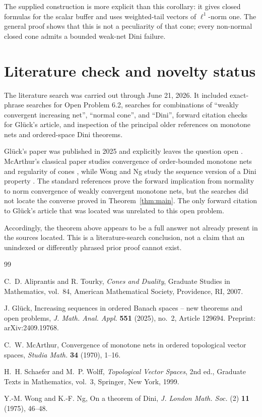 \documentclass[11pt]{article}
\theoremstyle{remark}
\begin{document}
The supplied construction is more explicit than this corollary: it gives
closed formulas for the scalar buffer and uses weighted-tail vectors of
$\ell^1$-norm one.  The general proof shows that this is not a peculiarity
of that cone; every non-normal closed cone admits a bounded weak-net Dini
failure.

\section{Literature check and novelty status}

The literature search was carried out through June 21, 2026.  It included
exact-phrase searches for Open Problem 6.2, searches for combinations of
``weakly convergent increasing net'', ``normal cone'', and ``Dini'', forward
citation checks for Gl\"uck's article, and inspection of the principal older
references on monotone nets and ordered-space Dini theorems.

Gl\"uck's paper was published in 2025 and explicitly leaves the question
open \cite{Glueck2025}.  McArthur's classical paper studies convergence of
order-bounded monotone nets and regularity of cones
\cite{McArthur1970}, while Wong and Ng study the sequence version of a Dini
property \cite{WongNg1975}.  The standard references prove the forward
implication from normality to norm convergence of weakly convergent
monotone nets, but the searches did not locate the converse proved in
Theorem~\ref{thm:main}.  The only forward citation to Gl\"uck's article that
was located was unrelated to this open problem.

Accordingly, the theorem above appears to be a full answer not already
present in the sources located.  This is a literature-search conclusion,
not a claim that an unindexed or differently phrased prior proof cannot
exist.

\begin{thebibliography}{99}

C.~D. Aliprantis and R. Tourky,
\emph{Cones and Duality},
Graduate Studies in Mathematics, vol.~84,
American Mathematical Society, Providence, RI, 2007.

J. Gl\"uck,
Increasing sequences in ordered Banach spaces -- new theorems and open
problems,
\emph{J. Math. Anal. Appl.} \textbf{551} (2025), no.~2, Article 129694.
Preprint: arXiv:2409.19768.

C.~W. McArthur,
Convergence of monotone nets in ordered topological vector spaces,
\emph{Studia Math.} \textbf{34} (1970), 1--16.

H.~H. Schaefer and M.~P. Wolff,
\emph{Topological Vector Spaces},
2nd ed., Graduate Texts in Mathematics, vol.~3,
Springer, New York, 1999.

Y.-M. Wong and K.-F. Ng,
On a theorem of Dini,
\emph{J. London Math. Soc.} (2) \textbf{11} (1975), 46--48.

\end{thebibliography}
\end{document}
